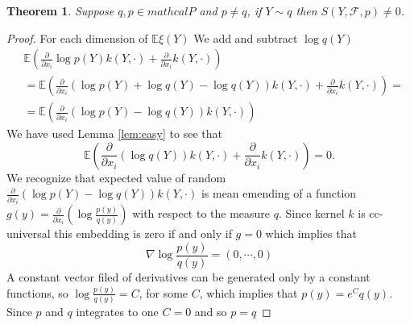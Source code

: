 \documentclass{article}
\newtheorem{Theorem}{Theorem}
\newcommand{\ev}{\mathbb{E}}
\begin{document}
\begin{Theorem}
\label{th2}
Suppose  $q,p \in mathcal{P}$ and $p\neq q $,  if $Y \sim q$  then $S(Y,\mathcal{F},p) \neq  0$.
\end{Theorem}

\begin{proof}
For each dimension of $\ev \xi(Y)$ We add and subtract $\log q(Y)$  
\begin{align*}
 &\ev \left( \frac{\partial } {\partial x_i} \log p(Y) k(Y,\cdot) + \frac{\partial } {\partial x_i} k(Y,\cdot)  \right) \\
 &=\ev \left( \frac{\partial } {\partial x_i} ( \log  p(Y) + \log  q(Y)- \log  q(Y)  )  k(Y,\cdot)   + \frac{\partial } {\partial x_i} k(Y,\cdot) \right) = \\
 &= \ev \left(  \frac{\partial } {\partial x_i} (\log p(Y) - \log q(Y))k(Y,\cdot) \right) 
\end{align*}
We have used Lemma \ref{lem:easy} to see that 
\[
\ev \left( \frac{\partial } {\partial x_i} (  \log  q(Y)  )  k(Y,\cdot)   + \frac{\partial } {\partial x_i} k(Y,\cdot) \right) =0.
\]
We recognize that expected value of random  $ \frac{\partial } {\partial x_i} (\log p(Y) - \log q(Y))  k(Y,\cdot)$ is mean emending of a function $g(y) =  \frac{\partial } {\partial x_i} (\log \frac{p(y)}{q(y)})$  with respect to  the measure $q$. Since kernel $k$ is cc-universal this embedding is zero if and only if $g = 0$ which implies that 
\[
 \nabla \log \frac{p(y)}{q(y)} = (0,\cdots ,0)
\]
A constant vector filed of derivatives  can be generated only by a constant functions, so $\log \frac{p(y)}{q(y)} =C$, for some $C$, which implies that  $p(y) = e^C q(y)$. Since $p$ and $q$ integrates to one $C=0$ and so $p=q$ 
\end{proof}
\end{document}
